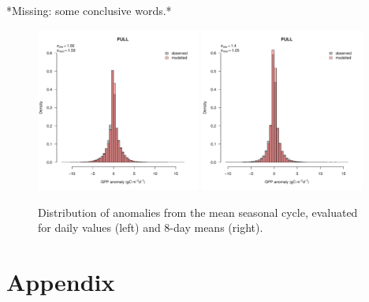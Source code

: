\documentclass{myreport}
\begin{document}
*Missing: some conclusive words.*

\begin{figure}[!ht]
    \centering
\includegraphics[width=0.48\textwidth]{fig/hist_anomalies_daily_FULL.pdf}
\includegraphics[width=0.48\textwidth]{fig/hist_anomalies_xdaily_FULL.pdf}
    \caption{Distribution of anomalies from the mean seasonal cycle, evaluated for daily values (left) and 8-day means (right).} 
    \label{fig:modobs_anomalies}
\end{figure}





\clearpage


\section{Appendix}
\end{document}
